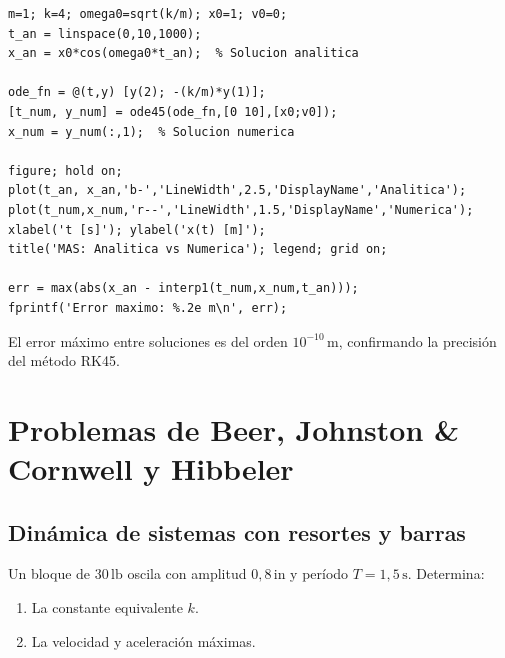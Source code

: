 \documentclass[12pt, a4paper, oneside]{book}
\begin{document}
\begin{solucion}
\begin{lstlisting}[style=matlab, caption={Comparaci\'on anal\'itica vs.\ num\'erica --- Problema 30}]
m=1; k=4; omega0=sqrt(k/m); x0=1; v0=0;
t_an = linspace(0,10,1000);
x_an = x0*cos(omega0*t_an);  % Solucion analitica

ode_fn = @(t,y) [y(2); -(k/m)*y(1)];
[t_num, y_num] = ode45(ode_fn,[0 10],[x0;v0]);
x_num = y_num(:,1);  % Solucion numerica

figure; hold on;
plot(t_an, x_an,'b-','LineWidth',2.5,'DisplayName','Analitica');
plot(t_num,x_num,'r--','LineWidth',1.5,'DisplayName','Numerica');
xlabel('t [s]'); ylabel('x(t) [m]');
title('MAS: Analitica vs Numerica'); legend; grid on;

err = max(abs(x_an - interp1(t_num,x_num,t_an)));
fprintf('Error maximo: %.2e m\n', err);
\end{lstlisting}

\begin{resultado}
El error m\'aximo entre soluciones es del orden $10^{-10}\,\text{m}$,
confirmando la precisi\'on del m\'etodo RK45.
\end{resultado}
\end{solucion}

\chapter{Problemas de Beer, Johnston \& Cornwell y Hibbeler}

\section{Din\'amica de sistemas con resortes y barras}

\begin{problema}[title={Problema~31 --- Beer, Johnston \& Cornwell (19.21)}]
Un bloque de $30\,\text{lb}$ oscila con amplitud $0{,}8\,\text{in}$ y
per\'iodo $T = 1{,}5\,\text{s}$. Determina:
\begin{enumerate}[label=\alph*)]
  \item La constante equivalente $k$.
  \item La velocidad y aceleraci\'on m\'aximas.
\end{enumerate}
\end{problema}
\end{document}
